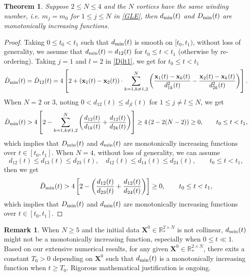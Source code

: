 \documentclass{aims}
\theoremstyle{plain}
\newtheorem{theorem}{Theorem}[section]
\theoremstyle{definition}
\newtheorem{remark}{Remark}[section]
\newcommand{\bx}{{\mathbf x}}
\newcommand{\bX}{{\mathbf X}}
\newcommand{\be} {\begin{equation}}
\newcommand{\ee}{\end{equation}}
\begin{document}
\begin{theorem}\label{N234}
Suppose $2\le N\le 4$ and the $N$ vortices have the same winding number, i.e. $m_j=m_0$ for $1 \le j\le N$ in \eqref{GLE}, then
$d_{\rm min}(t)$ and $D_{\rm min}(t)$ are monotonically increasing functions.
\end{theorem}
\begin{proof}
Taking $0\le t_0<t_1$ such that $d_{\rm min}(t)$ is smooth on $[t_0,t_1)$,
without loss of generality, we assume that $d_{\rm min}(t)=d_{12}(t)$ for
$t_0\le t<t_1$ (otherwise by re-ordering).
Taking $j=1$ and $l=2$ in \eqref{Djlt1}, we get for $t_0\le t<t_1$
\be
\dot D_{\rm min}(t)=\dot D_{12}(t)
=4\left[2+(\mathbf
x_1(t)-\mathbf x_2(t))\cdot\sum_{k=1,k\ne 1,2}^N\left(\frac{\bx_1(t)-\bx_k(t)} {d_{1k}^2(t)}-
\frac{\bx_2(t)-\bx_k(t)} {d_{2k}^2(t)}\right)\right].\nonumber
\ee
When $N=2$ or $3$, noting $0<d_{12}(t)\le d_{jl}(t)$ for $1\le j\ne l \le N$,
we get
\be
\dot D_{\rm min}(t)>
4\left[2-
\sum_{k=1,k\ne 1,2}^N\left(\frac{d_{12}(t)} {d_{1k}(t)}+
\frac{d_{12}(t)} {d_{2k}(t)}\right)\right]
\ge4\left(2-2(N-2)\right)\ge0, \qquad t_0\le t<t_1,\nonumber
\ee
which implies that $D_{\rm min}(t)$ and $d_{\rm min}(t)$
are monotonically increasing functions over $t\in [t_0,t_1]$.
When $N=4$, without loss of generality, we can assume
\begin{equation*}
d_{12}(t)\leq d_{13}(t)\leq d_{23}(t), \quad  d_{12}(t)\leq d_{14}(t)\leq d_{24}(t),\qquad t_0\le t<t_1,
\end{equation*}
then we get
\be
\dot D_{\rm min}(t)>
4\left[2-
\left(\frac{d_{12}(t)} {d_{23}(t)}+
\frac{d_{12}(t)} {d_{24}(t)}\right)\right] \ge0, \qquad t_0\le t<t_1,\nonumber
\ee
which implies that $D_{\rm min}(t)$ and $d_{\rm min}(t)$
are monotonically increasing functions over $t\in [t_0,t_1]$.
\end{proof}


\begin{remark}
When $N\ge5$ and the initial data $\bX^0\in
{\mathbb R}_*^{2\times N}$ is not collinear, $d_{\rm min}(t)$ might not be a
monotonically increasing function, especially when $0\le t\ll 1$. Based on our extensive numerical results, for any given  $\bX^0\in
{\mathbb R}_*^{2\times N}$, there exits a constant $T_{0}>0$ depending on $\bX^0$ such that $d_{\rm min}(t)$
is a monotonically increasing function when $t\ge T_{0}$.
Rigorous mathematical justification is ongoing.
\end{remark}


\end{document}
